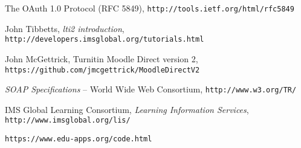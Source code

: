 \documentclass{article}
\begin{document}
\begin{thebibliography}{9}

The OAuth 1.0 Protocol (RFC 5849), \hfill\hbox{}
{\tt http://tools.ietf.org/html/rfc5849}

 John Tibbetts,
{\it lti2 introduction}, \hfill\hbox{}
{\tt http://developers.imsglobal.org/tutorials.html}

 John McGettrick,
Turnitin Moodle Direct version 2, \hfill\hbox{}
{\tt https://github.com/jmcgettrick/MoodleDirectV2}

{\it SOAP Specifications} -- World Wide Web Consortium, \hfill\hbox{}
{\tt http://www.w3.org/TR/}

IMS Global Learning Consortium, {\it Learning Information
Services},\hfill\hbox{}
{\tt http://www.imsglobal.org/lis/}

{\tt https://www.edu-apps.org/code.html}

\end{thebibliography}
\end{document}
